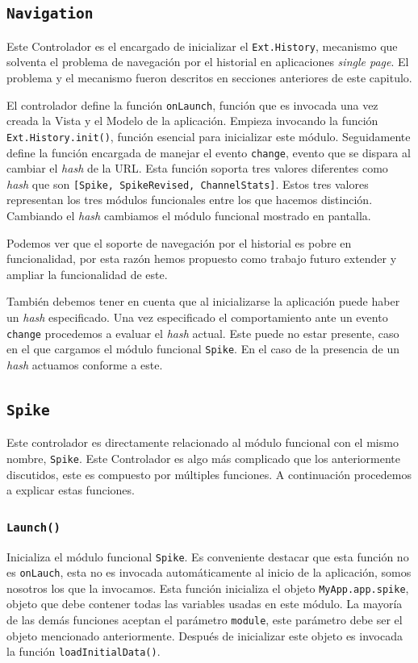 	\subsection{\texttt{Navigation}}
		Este Controlador es el encargado de inicializar el \texttt{Ext.History}, mecanismo que solventa el problema de navegación por el
		historial en aplicaciones \emph{single page}. El problema y el mecanismo fueron descritos en secciones anteriores de este capitulo.
		\par
		El controlador  define la función \texttt{onLaunch}, función que es invocada una vez creada la Vista y el Modelo de la aplicación.
		Empieza invocando la función \texttt{Ext.History.init()}, función esencial para inicializar este módulo. Seguidamente define la
		función encargada de manejar el evento \texttt{change}, evento que se dispara al cambiar el \emph{hash} de la URL. Esta función
		soporta tres valores diferentes como \emph{hash} que son \texttt{[Spike, SpikeRevised, ChannelStats]}. Estos tres valores
		representan los tres módulos funcionales entre los que hacemos distinción.  Cambiando el \emph{hash} cambiamos el módulo funcional
		mostrado en pantalla.
		\par
		Podemos ver que el soporte de navegación por el historial es pobre en funcionalidad, por esta razón hemos propuesto como trabajo
		futuro extender y ampliar la funcionalidad de este.
		\par
		También debemos tener en cuenta que al inicializarse la aplicación puede haber un \emph{hash} especificado. Una vez especificado el
		comportamiento ante un evento \texttt{change} procedemos a evaluar el \emph{hash} actual. Este puede no estar presente, caso en el que
		cargamos el módulo funcional \texttt{Spike}. En el caso de la presencia de un \emph{hash} actuamos conforme a este.
	\subsection{\texttt{Spike}}
		Este controlador es directamente relacionado al módulo funcional con el mismo nombre, \texttt{Spike}. Este Controlador es algo más
		complicado que los anteriormente discutidos, este es compuesto por múltiples funciones. A continuación procedemos a explicar estas
		funciones.
		\subsubsection{\texttt{Launch()}}
			Inicializa el módulo funcional \texttt{Spike}. Es conveniente destacar que esta función no es \texttt{onLauch}, esta no es
			invocada automáticamente al inicio de la aplicación, somos nosotros los que la invocamos. Esta función inicializa el objeto
			\texttt{MyApp.app.spike}, objeto que debe contener todas las variables usadas en este módulo. La mayoría de las demás
			funciones aceptan el parámetro \texttt{module}, este parámetro debe ser el objeto mencionado anteriormente. Después de
			inicializar este objeto es invocada la función \texttt{loadInitialData()}.
